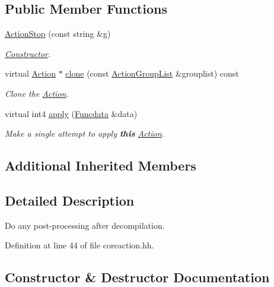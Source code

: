 \subsection*{Public Member Functions}
\begin{DoxyCompactItemize}
\item 
\mbox{\hyperlink{class_action_stop_abab34d77c374f0900c2ec274e569a3a9}{Action\+Stop}} (const string \&g)
\begin{DoxyCompactList}\small\item\em \mbox{\hyperlink{class_constructor}{Constructor}}. \end{DoxyCompactList}\item 
virtual \mbox{\hyperlink{class_action}{Action}} $\ast$ \mbox{\hyperlink{class_action_stop_a3b262cbd121ab1595178c1248ca409a3}{clone}} (const \mbox{\hyperlink{class_action_group_list}{Action\+Group\+List}} \&grouplist) const
\begin{DoxyCompactList}\small\item\em Clone the \mbox{\hyperlink{class_action}{Action}}. \end{DoxyCompactList}\item 
virtual int4 \mbox{\hyperlink{class_action_stop_a2d539e33984e982dad5cc306141c9787}{apply}} (\mbox{\hyperlink{class_funcdata}{Funcdata}} \&data)
\begin{DoxyCompactList}\small\item\em Make a single attempt to apply {\bfseries{this}} \mbox{\hyperlink{class_action}{Action}}. \end{DoxyCompactList}\end{DoxyCompactItemize}
\subsection*{Additional Inherited Members}


\subsection{Detailed Description}
Do any post-\/processing after decompilation. 

Definition at line 44 of file coreaction.\+hh.



\subsection{Constructor \& Destructor Documentation}
\mbox{\label{class_action_stop_abab34d77c374f0900c2ec274e569a3a9}} 
